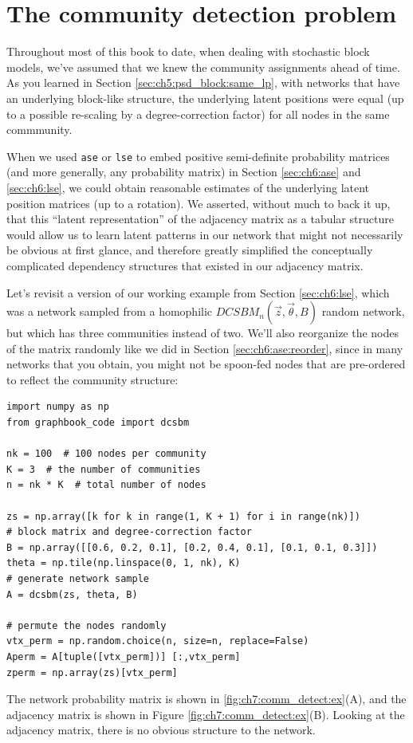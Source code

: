 \section{The community detection problem}
\label{sec:ch7:comm_detect}

Throughout most of this book to date, when dealing with stochastic block models, we've assumed that we knew the community assignments ahead of time. As you learned in Section \ref{sec:ch5:psd_block:same_lp}, with networks that have an underlying block-like structure, the underlying latent positions were equal (up to a possible re-scaling by a degree-correction factor) for all nodes in the same commmunity.

When we used \texttt{ase} or \texttt{lse} to embed positive semi-definite probability matrices (and more generally, any probability matrix) in Section \ref{sec:ch6:ase} and \ref{sec:ch6:lse}, we could obtain reasonable estimates of the underlying latent position matrices (up to a rotation). We asserted, without much to back it up, that this ``latent representation'' of the adjacency matrix as a tabular structure would allow us to learn latent patterns in our network that might not necessarily be obvious at first glance, and therefore greatly simplified the conceptually complicated dependency structures that existed in our adjacency matrix. 

Let's revisit a version of our working example from Section \ref{sec:ch6:lse}, which was a network sampled from a homophilic $DCSBM_n(\vec z, \vec\theta, B)$ random network, but which has three communities instead of two. We'll also reorganize the nodes of the matrix randomly like we did in Section \ref{sec:ch6:ase:reorder}, since in many networks that you obtain, you might not be spoon-fed nodes that are pre-ordered to reflect the community structure:

\begin{lstlisting}[style=python]
import numpy as np
from graphbook_code import dcsbm

nk = 100  # 100 nodes per community
K = 3  # the number of communities
n = nk * K  # total number of nodes

zs = np.array([k for k in range(1, K + 1) for i in range(nk)])
# block matrix and degree-correction factor
B = np.array([[0.6, 0.2, 0.1], [0.2, 0.4, 0.1], [0.1, 0.1, 0.3]])
theta = np.tile(np.linspace(0, 1, nk), K)
# generate network sample
A = dcsbm(zs, theta, B)

# permute the nodes randomly
vtx_perm = np.random.choice(n, size=n, replace=False)
Aperm = A[tuple([vtx_perm])] [:,vtx_perm]
zperm = np.array(zs)[vtx_perm]
\end{lstlisting}
The network probability matrix is shown in \ref{fig:ch7:comm_detect:ex}(A), and the adjacency matrix is shown in Figure \ref{fig:ch7:comm_detect:ex}(B). Looking at the adjacency matrix, there is no obvious structure to the network.


